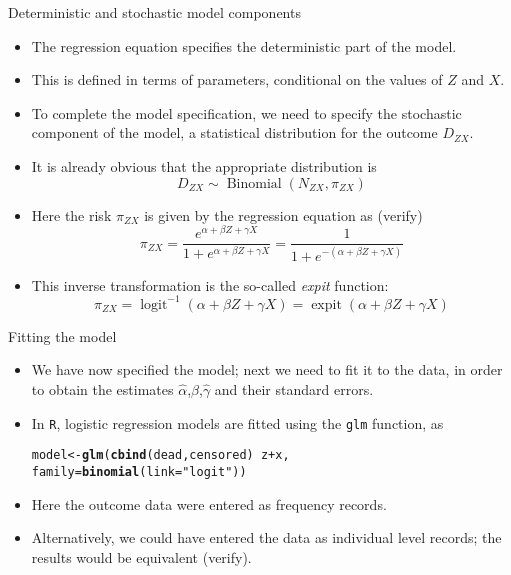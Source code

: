 \documentclass[10pt]{beamer}\usepackage[]{graphicx}\usepackage[]{color}
\makeatletter
\newcommand{\hlstr}[1]{\textcolor[rgb]{0.192,0.494,0.8}{#1}}%
\newcommand{\hlopt}[1]{\textcolor[rgb]{0,0,0}{#1}}%
\newcommand{\hlstd}[1]{\textcolor[rgb]{0.345,0.345,0.345}{#1}}%
\newcommand{\hlkwb}[1]{\textcolor[rgb]{0.69,0.353,0.396}{#1}}%
\newcommand{\hlkwc}[1]{\textcolor[rgb]{0.333,0.667,0.333}{#1}}%
\newcommand{\hlkwd}[1]{\textcolor[rgb]{0.737,0.353,0.396}{\textbf{#1}}}%
\newenvironment{kframe}{%
 \def\at@end@of@kframe{}%
 \ifinner\ifhmode%
  \def\at@end@of@kframe{\end{minipage}}%
  \begin{minipage}{\columnwidth}%
 \fi\fi%
 \def\FrameCommand##1{\hskip\@totalleftmargin \hskip-\fboxsep
 \colorbox{shadecolor}{##1}\hskip-\fboxsep
     \hskip-\linewidth \hskip-\@totalleftmargin \hskip\columnwidth}%
 \MakeFramed {\advance\hsize-\width
   \@totalleftmargin\z@ \linewidth\hsize
   \@setminipage}}%
 {\par\unskip\endMakeFramed%
 \at@end@of@kframe}
\newenvironment{knitrout}{}{} %
\makeatother
\begin{document}
\begin{frame}{Deterministic and stochastic model components}
	\begin{itemize}
		\item 
		The regression equation specifies the deterministic part of the model.
		
		\item This is defined in terms of parameters, conditional on the values of $Z$ and $X$.
		
		\item To complete the model specification, we need to specify the stochastic component of the model, a statistical distribution for the outcome $D_{Z X}$. 
		\item It is already obvious that the appropriate distribution is
		$$
		D_{Z X} \sim \operatorname{Binomial}\left(N_{Z X}, \pi_{Z X}\right)
		$$
		\item Here the risk $\pi_{Z X}$ is given by the regression equation as (verify)
		$$
		\pi_{Z X}=\frac{e^{\alpha+\beta Z+\gamma X}}{1+e^{\alpha+\beta Z+\gamma X}}=\frac{1}{1+e^{-(\alpha+\beta Z+\gamma X)}}
		$$
		\item This inverse transformation is the so-called \textit{expit} function:
		$$
		\pi_{Z X}=\operatorname{logit}^{-1}(\alpha+\beta Z+\gamma X)=\operatorname{expit}(\alpha+\beta Z+\gamma X)
		$$
	\end{itemize}
\end{frame}



\begin{frame}[fragile]{Fitting the model}
\begin{itemize}
	\item We have now specified the model; next we need to fit it to the data, in order to obtain the estimates $\hat{\alpha}$,$\hat{\beta}$,$\hat{\gamma}$ and	their standard errors.
	\item In \texttt{R}, logistic regression models are fitted using the \texttt{glm} function, as
\begin{knitrout}
\color{fgcolor}\begin{kframe}
\begin{alltt}
\hlstd{model} \hlkwb{<-} \hlkwd{glm}\hlstd{(}\hlkwd{cbind}\hlstd{(dead,censored)} \hlopt{~} \hlstd{z} \hlopt{+} \hlstd{x,}
               \hlkwc{family}\hlstd{=}\hlkwd{binomial}\hlstd{(}\hlkwc{link}\hlstd{=}\hlstr{"logit"}\hlstd{))}
\end{alltt}
\end{kframe}
\end{knitrout}
	\item Here the outcome data were entered as frequency records.
	\item Alternatively, we could have entered the data as individual level records; the results would be equivalent (verify).
\end{itemize}
\end{frame}
\end{document}
